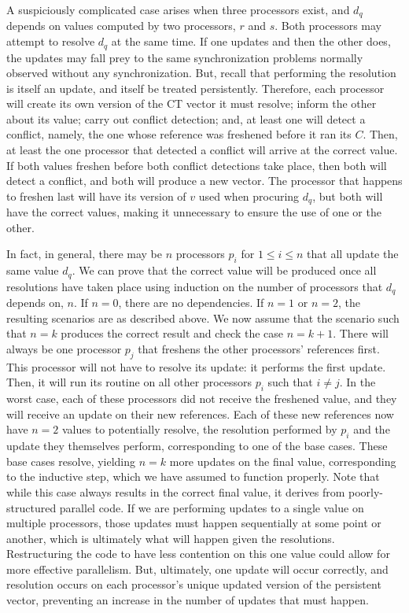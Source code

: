 A suspiciously complicated case arises when three processors exist, and $d_q$
depends on values computed by two processors, $r$ and $s$. Both processors may
attempt to resolve $d_q$ at the same time. If one updates and then the other
does, the updates may fall prey to the same synchronization problems normally
observed without any synchronization. But, recall that performing the resolution
is itself an update, and itself be treated persistently. Therefore, each
processor will create its own version of the CT vector it must resolve; inform
the other about its value; carry out conflict detection; and, at least one will
detect a conflict, namely, the one whose reference was freshened before it ran
its $C$. Then, at least the one processor that detected a conflict will arrive
at the correct value. If both values freshen before both conflict detections
take place, then both will detect a conflict, and both will produce a new
vector. The processor that happens to freshen last will have its version of $v$
used when procuring $d_q$, but both will have the correct values, making it
unnecessary to ensure the use of one or the other.

In fact, in general, there may be $n$ processors $p_i$ for $1 \leq i \leq n$
that all update the same value $d_q$.  We can prove that the correct value will
be produced once all resolutions have taken place using induction on the number
of processors that $d_q$ depends on, $n$. If $n=0$, there are no dependencies.
If $n=1$ or $n=2$, the resulting scenarios are as described above. We now assume
that the scenario such that $n=k$ produces the correct result and check the case
$n=k+1$. There will always be one processor $p_j$ that freshens the other
processors' references first. This processor will not have to resolve its
update: it performs the first update. Then, it will run its routine on all
other processors $p_i$ such that $i \neq j$. In the worst case, each of these
processors did not receive the freshened value, and they will receive an update
on their new references. Each of these new references now have $n=2$ values to
potentially resolve, the resolution performed by $p_i$ and the update they
themselves perform, corresponding to one of the base cases. These base cases
resolve, yielding $n=k$ more updates on the final value, corresponding to the
inductive step, which we have assumed to function properly. Note that while this
case always results in the correct final value, it derives from
poorly-structured parallel code. If we are performing updates to a single value
on multiple processors, those updates must happen sequentially at some point or
another, which is ultimately what will happen given the resolutions.
Restructuring the code to have less contention on this one value could allow for
more effective parallelism. But, ultimately, one update will occur correctly,
and resolution occurs on each processor's unique updated version of the
persistent vector, preventing an increase in the number of updates that must
happen.

